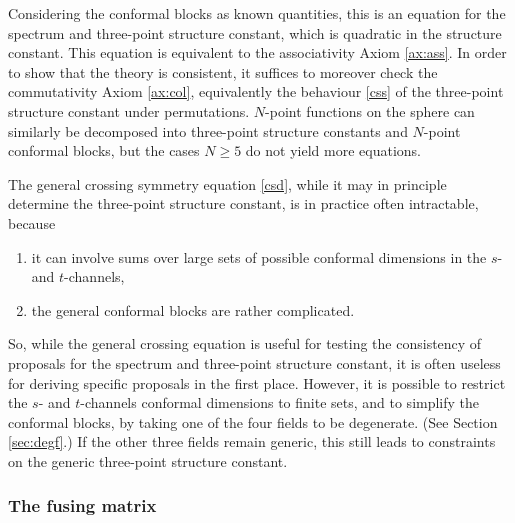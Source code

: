 \documentclass[12pt, a4paper, notitlepage, twoside]{report}
\numberwithin{equation}{section}
\theoremstyle{break}
\begin{document}
Considering the conformal blocks as known quantities, this is an equation for the spectrum and three-point structure constant, which is quadratic in the structure constant.
This equation is equivalent to the associativity Axiom \ref{ax:ass}. In order to show that the theory is consistent, it suffices to moreover check the commutativity Axiom \ref{ax:col}, equivalently the behaviour \eqref{css} of the three-point structure constant under permutations. 
$N$-point functions on the sphere can similarly be decomposed into three-point structure constants and $N$-point conformal blocks, but the cases $N\geq 5$ do not yield more equations. 

The general crossing symmetry equation \eqref{csd}, while it may in principle determine the three-point structure constant, is in practice often intractable, because
\begin{enumerate}
 \item it can involve sums over large sets of possible conformal dimensions in the $s$- and $t$-channels, 
 \item the general conformal blocks are rather complicated. 
\end{enumerate}
So, while the general crossing equation is useful for testing the consistency of proposals for the spectrum and three-point structure constant, it is often useless for deriving specific proposals in the first place. However, it is possible to restrict the $s$- and $t$-channels conformal dimensions to finite sets, and to simplify the conformal blocks, by taking one of the four fields to be degenerate. (See Section \ref{sec:degf}.) If the other three fields remain generic, this still leads to constraints on the generic three-point structure constant. 

\subsubsection{The fusing matrix}
\end{document}
